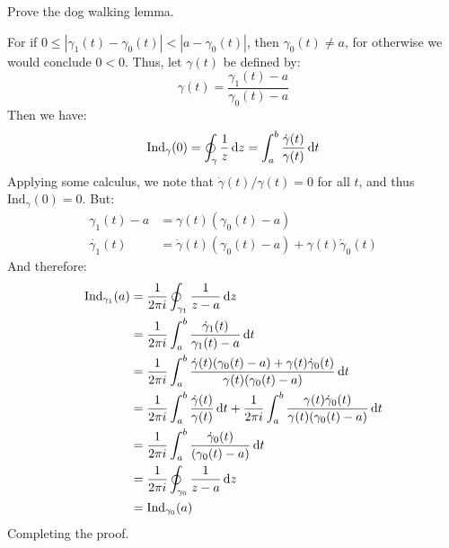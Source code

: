 \documentclass[crop=false,class=article]{standalone}                           %
\begin{document}
    \begin{problem}
        Prove the dog walking lemma.
    \end{problem}
    \begin{solution}
        For if $0\leq|\gamma_{1}(t)-\gamma_{0}(t)|<|a-\gamma_{0}(t)|$, then
        $\gamma_{0}(t)\ne{a}$, for otherwise we would conclude $0<0$. Thus, let
        $\gamma(t)$ be defined by:
        \begin{equation}
            \gamma(t)=\frac{\gamma_{1}(t)-a}{\gamma_{0}(t)-a}
        \end{equation}
        Then we have:
        \begin{equation}
            \textrm{Ind}_{\gamma}(0)=\oint_{\gamma}\frac{1}{z}\mathop{}\!\mathrm{d}{z}
            =\int_{a}^{b}\frac{\dot{\gamma}(t)}{\gamma(t)}\mathop{}\!\mathrm{d}{t}
        \end{equation}
        Applying some calculus, we note that $\dot{\gamma}(t)/\gamma(t)=0$ for
        all $t$, and thus $\textrm{Ind}_{\gamma}(0)=0$. But:
        \begin{align}
            \gamma_{1}(t)-a&=\gamma(t)(\gamma_{0}(t)-a)\\
            \dot{\gamma_{1}}(t)
                &=\dot{\gamma}(t)(\gamma_{0}(t)-a)+\gamma(t)\dot{\gamma}_{0}(t)
        \end{align}
        And therefore:
        \begin{align}
            \textrm{Ind}_{\gamma_{1}}(a)
            &=\frac{1}{2\pi{i}}\oint_{\gamma_{1}}\frac{1}{z-a}\mathop{}\!\mathrm{d}{z}\\
            &=\frac{1}{2\pi{i}}\int_{a}^{b}
                \frac{\dot{\gamma}_{1}(t)}{\gamma_{1}(t)-a}\mathop{}\!\mathrm{d}{t}\\
            &=\frac{1}{2\pi{i}}\int_{a}^{b}
            \frac{\dot{\gamma}(t)(\gamma_{0}(t)-a)+\gamma(t)\dot{\gamma}_{0}(t)}
                 {\gamma(t)(\gamma_{0}(t)-a)}\mathop{}\!\mathrm{d}{t}\\
            &=\frac{1}{2\pi{i}}\int_{a}^{b}\frac{\dot{\gamma}(t)}{\gamma(t)}
                \mathop{}\!\mathrm{d}{t}
             +\frac{1}{2\pi{i}}\int_{a}^{b}\frac{\gamma(t)\dot{\gamma}_{0}(t)}
                {\gamma(t)(\gamma_{0}(t)-a)}\mathop{}\!\mathrm{d}{t}\\
            &=\frac{1}{2\pi{i}}\int_{a}^{b}\frac{\dot{\gamma}_{0}(t)}
                {(\gamma_{0}(t)-a)}\mathop{}\!\mathrm{d}{t}\\
            &=\frac{1}{2\pi{i}}\oint_{\gamma_{0}}\frac{1}{z-a}\mathop{}\!\mathrm{d}{z}\\
            &=\textrm{Ind}_{\gamma_{0}}(a)
        \end{align}
        Completing the proof.
    \end{solution}
\end{document}
